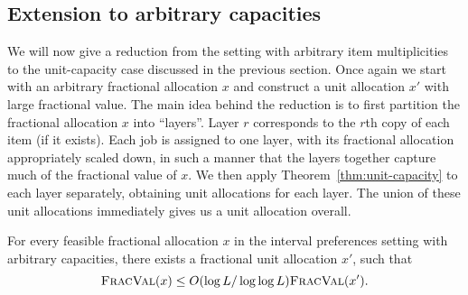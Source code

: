 \subsection{Extension to arbitrary capacities}
\label{sec:arbit-cap-ub}

We will now give a reduction from the setting with arbitrary item
multiplicities to the unit-capacity case discussed in the previous section.
Once again we start with an arbitrary fractional allocation $x$ and construct a
unit allocation $x'$ with large fractional value. The main idea behind the
reduction is to first partition the fractional allocation $x$ into ``layers''.
Layer $r$ corresponds to the $r$th copy of each item (if it exists). Each job
is assigned to one layer, with its fractional allocation appropriately scaled
down, in such a manner that the layers together capture much of the fractional
value of $x$. We then apply Theorem~\ref{thm:unit-capacity} to each layer
separately, obtaining unit allocations for each layer. The union of these unit
allocations immediately gives us a unit allocation overall.

\begin{theorem}
    \label{thm:arbit-capacity}
    For every feasible fractional allocation $x$ in the interval
    preferences setting with arbitrary capacities, there exists a
    fractional unit allocation $x'$, such that
    \[
        {\normalfont\textsc{FracVal}}(x)\le  O(\log L/\log\log L){\normalfont\textsc{FracVal}}(x').
    \]
\end{theorem}

